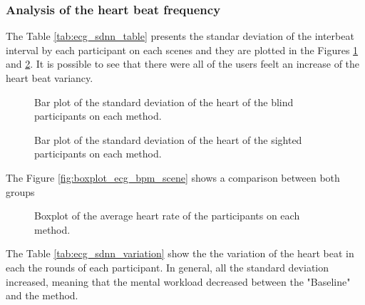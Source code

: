 %
%
\subsubsection{Analysis of the heart beat frequency}
%
The Table \ref{tab:ecg_sdnn_table} presents the standar deviation of the interbeat interval by each participant on each scenes and they are plotted in the Figures \ref{fig:barplot_ecg_sdnn_scene_blind} and \ref{fig:barplot_ecg_sdnn_scene_sight}. It is possible to see that there were all of the users feelt an increase of the heart beat variancy.



\begin{figure}[!htb]
    \centering
    \resizebox{0.6\linewidth}{!}{
    
    }
    \caption{Bar plot of the standard deviation of the heart of the blind participants on each method.}
    \label{fig:barplot_ecg_sdnn_scene_blind}
\end{figure}

\begin{figure}[!htb]
    \centering
    \resizebox{0.6\linewidth}{!}{
        
    }
    \caption{Bar plot of the standard deviation of the heart of the sighted participants on each method.}
    \label{fig:barplot_ecg_sdnn_scene_sight}
\end{figure}

The Figure \ref{fig:boxplot_ecg_bpm_scene} shows a comparison between both groups

\begin{figure}[!htb]
    \centering
    \resizebox{0.6\linewidth}{!}{
        
    }
    \caption{Boxplot of the average heart rate of the participants on each method.}
    \label{fig:boxplot_ecg_sdnn_box_scene}
\end{figure}

The Table \ref{tab:ecg_sdnn_variation} show the the variation of the heart beat in each the rounds of each participant. In general, all the standard deviation increased, meaning that the mental workload decreased between the "Baseline" and the method.

